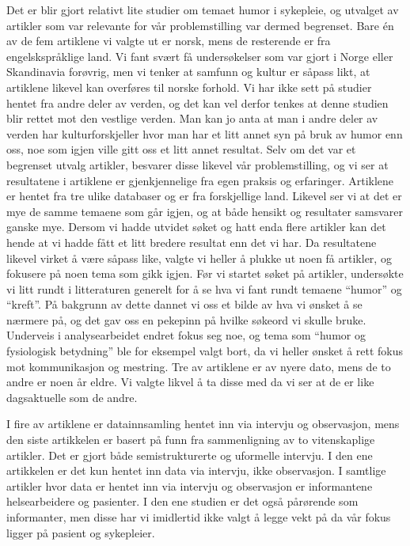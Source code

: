 Det er blir gjort relativt lite studier om temaet humor i sykepleie, og
utvalget av artikler som var relevante for vår problemstilling var dermed
begrenset. Bare én av de fem artiklene vi valgte ut er norsk, mens de
resterende er fra engelskspråklige land. Vi fant svært få undersøkelser som var
gjort i Norge eller Skandinavia forøvrig, men vi tenker at samfunn og kultur er
såpass likt, at artiklene likevel kan overføres til norske forhold. Vi har ikke
sett på studier hentet fra andre deler av verden, og det kan vel derfor tenkes
at denne studien blir rettet mot den vestlige verden. Man kan jo anta at man i
andre deler av verden har kulturforskjeller hvor man har et litt annet syn på
bruk av humor enn oss, noe som igjen ville gitt oss et litt annet resultat.
Selv om det var et begrenset utvalg artikler, besvarer disse likevel vår
problemstilling, og vi ser at resultatene i artiklene er gjenkjennelige fra
egen praksis og erfaringer.  Artiklene er hentet fra tre ulike databaser og er
fra forskjellige land. Likevel ser vi at det er mye de samme temaene som går
igjen, og at både hensikt og resultater samsvarer ganske mye. Dersom vi hadde
utvidet søket og hatt enda flere artikler kan det hende at vi hadde fått et
litt bredere resultat enn det vi har. Da resultatene likevel virket å være
såpass like, valgte vi heller å plukke ut noen få artikler, og fokusere på noen
tema som gikk igjen. Før vi startet søket på artikler, undersøkte vi litt rundt
i litteraturen generelt for å se hva vi fant rundt temaene “humor” og “kreft”.
På bakgrunn av dette dannet vi oss et bilde av hva vi ønsket å se nærmere på,
og det gav oss en pekepinn på hvilke søkeord vi skulle bruke. Underveis i
analysearbeidet endret fokus seg noe, og tema som “humor og fysiologisk
betydning” ble for eksempel valgt bort, da vi heller ønsket å rett fokus mot
kommunikasjon og mestring.  Tre av artiklene er av nyere dato, mens de to andre
er noen år eldre. Vi valgte likvel å ta disse med da vi ser at de er like
dagsaktuelle som de andre.

I fire av artiklene er datainnsamling hentet inn via intervju og observasjon,
mens den siste artikkelen er basert på funn fra sammenligning av to
vitenskaplige artikler. Det er gjort både semistrukturerte og uformelle
intervju.  I den ene  artikkelen er det kun hentet inn data via intervju, ikke
observasjon. I samtlige artikler hvor data er hentet inn via intervju og
observasjon er informantene helsearbeidere og pasienter. I den ene studien er
det også pårørende som informanter, men disse har vi imidlertid ikke valgt å
legge vekt på da vår fokus ligger på pasient og sykepleier. 

